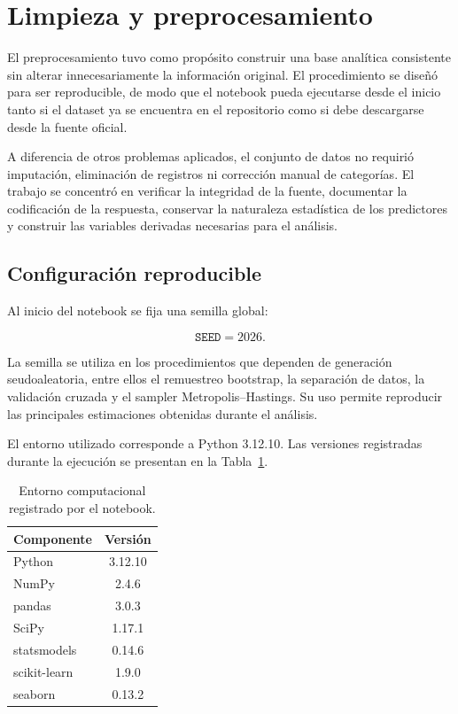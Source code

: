 \section{Limpieza y preprocesamiento}
\label{sec:preprocesamiento}

El preprocesamiento tuvo como propósito construir una base analítica
consistente sin alterar innecesariamente la información original. El
procedimiento se diseñó para ser reproducible, de modo que el notebook
pueda ejecutarse desde el inicio tanto si el dataset ya se encuentra en
el repositorio como si debe descargarse desde la fuente oficial.

A diferencia de otros problemas aplicados, el conjunto de datos no
requirió imputación, eliminación de registros ni corrección manual de
categorías. El trabajo se concentró en verificar la integridad de la
fuente, documentar la codificación de la respuesta, conservar la
naturaleza estadística de los predictores y construir las variables
derivadas necesarias para el análisis.

\subsection{Configuración reproducible}

Al inicio del notebook se fija una semilla global:

\[
\texttt{SEED}=2026.
\]

La semilla se utiliza en los procedimientos que dependen de generación
seudoaleatoria, entre ellos el remuestreo bootstrap, la separación de
datos, la validación cruzada y el sampler Metropolis--Hastings. Su uso
permite reproducir las principales estimaciones obtenidas durante el
análisis.

El entorno utilizado corresponde a Python 3.12.10. Las versiones
registradas durante la ejecución se presentan en la
Tabla~\ref{tab:entorno-computacional}.

\begin{table}[H]
    \centering
    \caption{Entorno computacional registrado por el notebook.}
    \label{tab:entorno-computacional}

    \begin{tabular}{lc}
        \toprule
        Componente & Versión \\
        \midrule
        Python & 3.12.10 \\
        NumPy & 2.4.6 \\
        pandas & 3.0.3 \\
        SciPy & 1.17.1 \\
        statsmodels & 0.14.6 \\
        scikit-learn & 1.9.0 \\
        seaborn & 0.13.2 \\
        \bottomrule
    \end{tabular}
\end{table}

